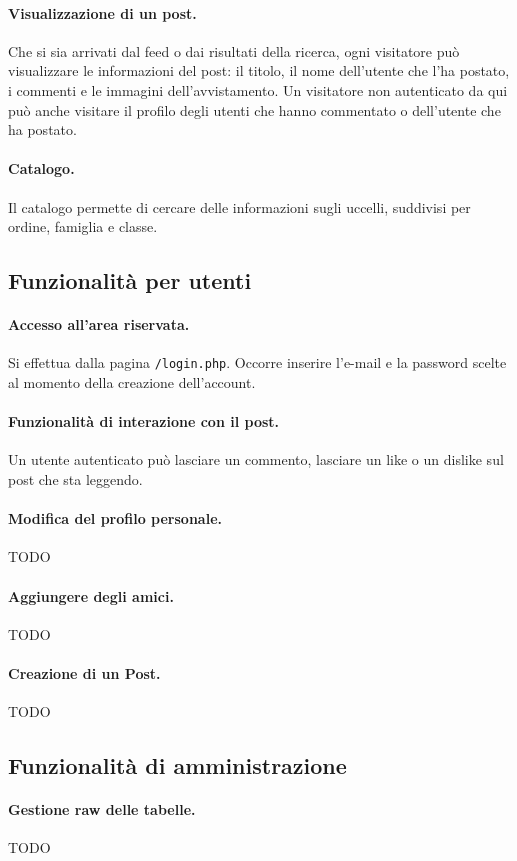 \documentclass[12pt, a4paper]{article}
\begin{document}
\paragraph{Visualizzazione di un post.} Che si sia arrivati dal feed o dai risultati della ricerca, ogni visitatore può visualizzare le informazioni del post: il titolo, il nome dell'utente che l'ha postato, i commenti e le immagini dell'avvistamento. Un visitatore non autenticato da qui può anche visitare il profilo degli utenti che hanno commentato o dell'utente che ha postato.
\paragraph{Catalogo.} Il catalogo permette di cercare delle informazioni sugli uccelli, suddivisi per ordine, famiglia e classe.
\subsection{Funzionalità per utenti}
\paragraph{Accesso all'area riservata.} 
Si effettua dalla pagina \texttt{/login.php}. Occorre inserire l'e-mail e la password scelte al momento della creazione dell'account. 
\paragraph{Funzionalità di interazione con il post.} Un utente autenticato può lasciare un commento, lasciare un like o un dislike sul post che sta leggendo.
\paragraph{Modifica del profilo personale.} TODO
\paragraph{Aggiungere degli amici.} TODO
\paragraph{Creazione di un Post.} TODO
\subsection{Funzionalità di amministrazione}
\paragraph{Gestione raw delle tabelle.} TODO
\end{document}
